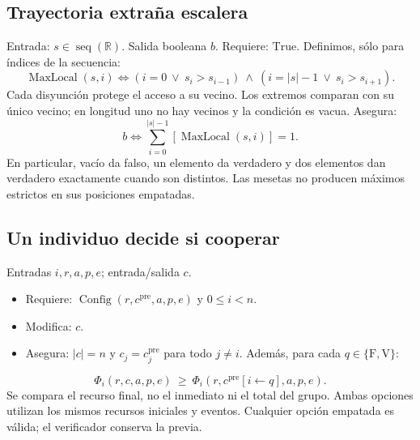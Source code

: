 \documentclass[11pt,a4paper]{article}
\newcommand{\R}{\mathbb R}
\newcommand{\Bool}{\{\mathrm F,\mathrm V\}}
\newcommand{\len}[1]{\lvert #1\rvert}
\newcommand{\pre}{^{\mathrm{pre}}}
\begin{document}
\subsection{Trayectoria extraña escalera}
Entrada: $s\in\operatorname{seq}(\R)$. Salida booleana $b$.
Requiere: $\mathrm{True}$.
Definimos, sólo para índices de la secuencia:
\[
 \operatorname{MaxLocal}(s,i)\iff
 (i=0\ \lor\ s_i>s_{i-1})\ \land\
 (i=\len{s}-1\ \lor\ s_i>s_{i+1}).
\]
Cada disyunción protege el acceso a su vecino. Los extremos comparan con
su único vecino; en longitud uno no hay vecinos y la condición es vacua.
Asegura:
\[
 b\iff\sum_{i=0}^{\len{s}-1}[\operatorname{MaxLocal}(s,i)]=1.
\]
En particular, vacío da falso, un elemento da verdadero y dos elementos
dan verdadero exactamente cuando son distintos. Las mesetas no producen
máximos estrictos en sus posiciones empatadas.

\subsection{Un individuo decide si cooperar}
Entradas $i,r,a,p,e$; entrada/salida $c$.
\begin{itemize}
\item Requiere: $\operatorname{Config}(r,c\pre,a,p,e)$ y $0\leq i<n$.
\item Modifica: $c$.
\item Asegura: $\len{c}=n$ y $c_j=c\pre_j$ para todo $j\neq i$.
      Además, para cada $q\in\Bool$:
\end{itemize}
\[
 \Phi_i(r,c,a,p,e)\ \geq\
 \Phi_i(r,c\pre[i\leftarrow q],a,p,e).
\]
Se compara el recurso final, no el inmediato ni el total del grupo.
Ambas opciones utilizan los mismos recursos iniciales y eventos.
Cualquier opción empatada es válida; el verificador conserva la previa.
\end{document}
